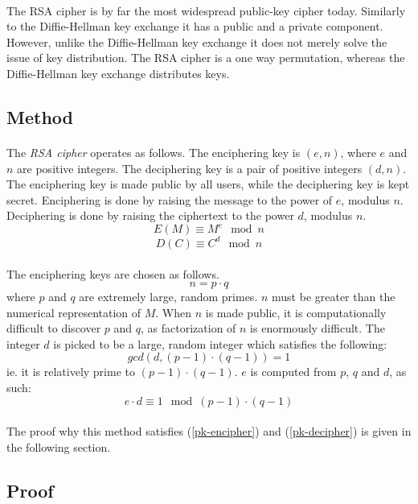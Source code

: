 \documentclass[a4paper, 10pt]{article}
\begin{document}
\paragraph*{}
The RSA cipher is by far the most widespread public-key cipher today. Similarly to the Diffie-Hellman key exchange it 
has a public and a private component. However, unlike the Diffie-Hellman key exchange it does not merely solve the 
issue of key distribution. The RSA cipher is a one way permutation, whereas the Diffie-Hellman key exchange distributes
 keys.

\subsection{Method}
\paragraph*{}
The \textit{RSA cipher} operates as follows. The enciphering key is $(e, n)$, where $e$ and $n$ are positive integers. 
The deciphering key is a pair of positive integers $(d, n)$. The enciphering key is made public by all users, while the
 deciphering key is kept secret. Enciphering is done by raising the message to the power of $e$, modulus $n$. 
Deciphering is done by raising the ciphertext to the power $d$, modulus $n$.
$$E(M) \equiv M^{e} \mod n$$
$$D(C) \equiv C^{d} \mod n$$

\paragraph*{}
The enciphering keys are chosen as follows.
$$n = p \cdot q$$
where $p$ and $q$ are extremely large, random primes. $n$ must be greater than the numerical representation of $M$. 
When $n$ is made public, it is computationally difficult to discover $p$ and $q$, as factorization of $n$ is 
enormously difficult. The integer $d$ is picked to be a large, random integer which satisfies the following:
$$gcd(d, (p - 1) \cdot (q - 1)) = 1$$
ie. it is relatively prime to $(p - 1) \cdot (q - 1)$. $e$ is computed from $p$, $q$ and $d$, as such:
$$e \cdot d \equiv 1 \mod (p-1) \cdot (q-1)$$

\paragraph*{}
The proof why this method satisfies (\ref{pk-encipher}) and (\ref{pk-decipher}) is given in the following section.

\subsection{Proof}
\end{document}
